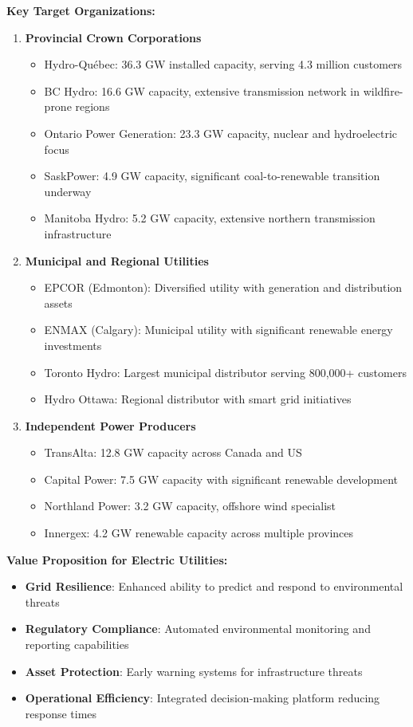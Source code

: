 \textbf{Key Target Organizations:}
\begin{enumerate}
    \item \textbf{Provincial Crown Corporations}
    \begin{itemize}
        \item Hydro-Québec: 36.3 GW installed capacity, serving 4.3 million customers
        \item BC Hydro: 16.6 GW capacity, extensive transmission network in wildfire-prone regions
        \item Ontario Power Generation: 23.3 GW capacity, nuclear and hydroelectric focus
        \item SaskPower: 4.9 GW capacity, significant coal-to-renewable transition underway
        \item Manitoba Hydro: 5.2 GW capacity, extensive northern transmission infrastructure
    \end{itemize}
    
    \item \textbf{Municipal and Regional Utilities}
    \begin{itemize}
        \item EPCOR (Edmonton): Diversified utility with generation and distribution assets
        \item ENMAX (Calgary): Municipal utility with significant renewable energy investments
        \item Toronto Hydro: Largest municipal distributor serving 800,000+ customers
        \item Hydro Ottawa: Regional distributor with smart grid initiatives
    \end{itemize}
    
    \item \textbf{Independent Power Producers}
    \begin{itemize}
        \item TransAlta: 12.8 GW capacity across Canada and US
        \item Capital Power: 7.5 GW capacity with significant renewable development
        \item Northland Power: 3.2 GW capacity, offshore wind specialist
        \item Innergex: 4.2 GW renewable capacity across multiple provinces
    \end{itemize}
\end{enumerate}

\textbf{Value Proposition for Electric Utilities:}
\begin{itemize}
    \item \textbf{Grid Resilience}: Enhanced ability to predict and respond to environmental threats
    \item \textbf{Regulatory Compliance}: Automated environmental monitoring and reporting capabilities
    \item \textbf{Asset Protection}: Early warning systems for infrastructure threats
    \item \textbf{Operational Efficiency}: Integrated decision-making platform reducing response times
\end{itemize}

